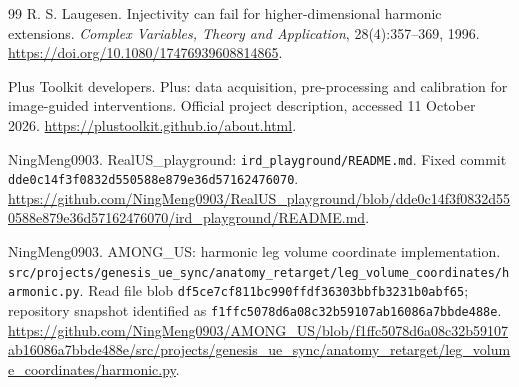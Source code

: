 \documentclass[UTF8,fontset=fandol,11pt,a4paper]{ctexart}
\theoremstyle{definition}\newtheorem{definition}[theorem]{定义}\newtheorem{assumption}[theorem]{条件}
\numberwithin{equation}{section}
\begin{document}
\begin{thebibliography}{99}
 R. S. Laugesen.
Injectivity can fail for higher-dimensional harmonic extensions.
\emph{Complex Variables, Theory and Application}, 28(4):357--369, 1996.
\url{https://doi.org/10.1080/17476939608814865}.

 Plus Toolkit developers.
Plus: data acquisition, pre-processing and calibration for image-guided interventions.
Official project description, accessed 11 October 2026.
\url{https://plustoolkit.github.io/about.html}.

 NingMeng0903.
RealUS\_playground: \texttt{ird\_playground/README.md}.
Fixed commit \texttt{dde0c14f3f0832d550588e879e36d57162476070}.
\url{https://github.com/NingMeng0903/RealUS_playground/blob/dde0c14f3f0832d550588e879e36d57162476070/ird_playground/README.md}.

 NingMeng0903.
AMONG\_US: harmonic leg volume coordinate implementation.
\texttt{src/projects/genesis\_ue\_sync/anatomy\_retarget/leg\_volume\_coordinates/harmonic.py}.
Read file blob \texttt{df5ce7cf811bc990ffdf36303bbfb3231b0abf65}; repository snapshot identified as \texttt{f1ffc5078d6a08c32b59107ab16086a7bbde488e}.
\url{https://github.com/NingMeng0903/AMONG_US/blob/f1ffc5078d6a08c32b59107ab16086a7bbde488e/src/projects/genesis_ue_sync/anatomy_retarget/leg_volume_coordinates/harmonic.py}.
\end{thebibliography}
\end{document}

